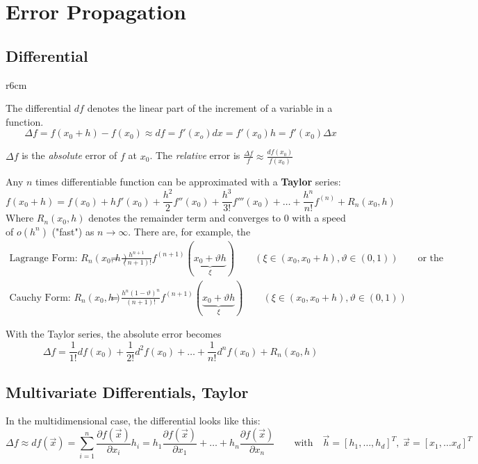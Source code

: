 \section{Error Propagation}

\subsection{Differential}
\begin{wrapfigure}{r}{6cm}
    
\end{wrapfigure}

The differential $df$ denotes the linear part of the increment of a variable in a function.
\[
    \Delta f = f(x_0+h)-f(x_0) \approx df = f'(x_o) dx = f'(x_0) h = f'(x_0) \Delta x
\]

$\Delta f$ is the \emph{absolute} error of $f$ at $x_0$.
The \emph{relative} error is $\frac{\Delta f}{f} \approx \frac{df(x_0)}{f(x_0)}$

Any $n$ times differentiable function can be approximated with a \textbf{Taylor} series:
$$f(x_0+h) = f(x_0) + h f'(x_0) + \frac{h^2}{2} f''(x_0) + \frac{h^3}{3!} f'''(x_0) +
\ldots + \frac{h^n}{n!} f^{(n)} + R_n(x_0,h)$$
Where $R_n(x_0,h)$ denotes the remainder term and converges to $0$ with a speed of $o(h^n)$ ("fast") as $n \rightarrow \infty$. There are, for example, the
\begin{align*}
    \text{Lagrange Form: } R_n(x_0,h) &= \frac{h^{n+1}}{(n+1)!} f^{(n+1)}(\underbrace{x_0 + \vartheta h}_{\xi})
    \qquad (\xi \in (x_0, x_0+h), \vartheta \in (0,1)) \qquad \text{or the} \\
    \text{Cauchy Form: } R_n(x_0,h) &= \frac{h^n(1-\vartheta)^n}{(n+1)!} f^{(n+1)}(\underbrace{x_0 + \vartheta h}_{\xi})
    \qquad (\xi \in (x_0, x_0+h), \vartheta \in (0,1))
\end{align*}

With the Taylor series, the absolute error becomes
\[
    \Delta f = \frac{1}{1!}df(x_0) + \frac{1}{2!}d^2f(x_0) + \ldots + \frac{1}{n!}d^n f(x_0) + R_n(x_0,h)
\]


\subsection{Multivariate Differentials, Taylor}
In the multidimensional case, the differential looks like this:
\[
    \Delta f \approx df(\vec{x}) = \sum\limits_{i=1}^n \frac{\partial f(\vec{x})}{\partial x_i} h_i = h_1 \frac{\partial f(\vec{x})}{\partial x_1} + \ldots +
    h_n \frac{\partial f(\vec{x})}{\partial x_n} \qquad \text{with} \quad \vec{h} = [h_1, \ldots, h_d]^T, \; \vec{x} = [x_1, \ldots x_d]^T
\]

